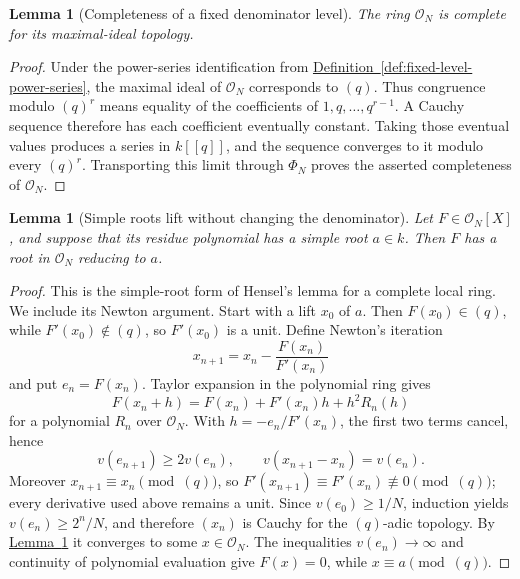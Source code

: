 \documentclass[11pt]{article}
\newcommand{\namedref}[2]{\hyperref[#2]{#1~\ref*{#2}}}
\theoremstyle{proofnote}
\newtheorem{lemma}[theorem]{Lemma}
\begin{document}
\begin{lemma}[Completeness of a fixed denominator level]
\label{lem:fixed-level}
  The ring \(\mathcal O_N\) is complete for its maximal-ideal topology.
\end{lemma}
\begin{proof}
  Under the power-series identification from
  \namedref{Definition}{def:fixed-level-power-series}, the maximal ideal of
  \(\mathcal O_N\) corresponds to \((q)\).  Thus
  congruence modulo \((q)^r\) means equality of the coefficients of
  \(1,q,\ldots,q^{r-1}\).  A Cauchy sequence therefore has each coefficient
  eventually constant.  Taking those eventual values produces a series in
  \(k[[q]]\), and the sequence converges to it modulo every \((q)^r\).
  Transporting this limit through \(\Phi_N\) proves the asserted completeness
  of \(\mathcal O_N\).
\end{proof}

\begin{lemma}[Simple roots lift without changing the denominator]
\label{lem:simple-lift}
  Let \(F\in\mathcal O_N[X]\), and suppose that its residue polynomial has
  a simple root \(a\in k\).  Then \(F\) has a root in \(\mathcal O_N\) reducing
  to \(a\).
\end{lemma}
\begin{proof}
  This is the simple-root form of Hensel's lemma for a complete local ring.
  We include its Newton argument.
  Start with a lift \(x_0\) of \(a\).  Then \(F(x_0)\in(q)\), while
  \(F'(x_0)\notin(q)\), so \(F'(x_0)\) is a unit.  Define Newton's iteration
  \[
    x_{n+1}=x_n-\frac{F(x_n)}{F'(x_n)}
  \]
  and put \(e_n=F(x_n)\).  Taylor expansion in the polynomial ring gives
  \[
    F(x_n+h)=F(x_n)+F'(x_n)h+h^2R_n(h)
  \]
  for a polynomial \(R_n\) over \(\mathcal O_N\).  With
  \(h=-e_n/F'(x_n)\), the first two terms cancel, hence
  \[
    v(e_{n+1})\ge 2v(e_n),\qquad
    v(x_{n+1}-x_n)=v(e_n).
  \]
  Moreover \(x_{n+1}\equiv x_n\pmod{(q)}\), so
  \(F'(x_{n+1})\equiv F'(x_n)\not\equiv0\pmod{(q)}\); every derivative used
  above remains a unit.  Since \(v(e_0)\ge1/N\), induction yields
  \(v(e_n)\ge2^n/N\), and therefore
  \((x_n)\) is Cauchy for the \((q)\)-adic topology.  By
  \namedref{Lemma}{lem:fixed-level} it converges to some \(x\in\mathcal O_N\).
  The inequalities \(v(e_n)\to\infty\) and continuity of polynomial
  evaluation give \(F(x)=0\), while \(x\equiv a\pmod{(q)}\).
\end{proof}
\end{document}
